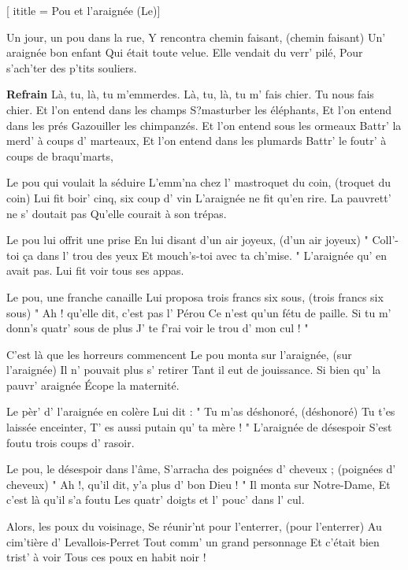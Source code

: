  [
ititle = {Pou et l'araignée (Le)}]



\beginverse
Un jour, un pou dans la rue,
Y rencontra chemin faisant, (chemin faisant)
Un' araignée bon enfant
Qui était toute velue.
Elle vendait du verr' pilé,
Pour s'ach'ter des p'tits souliers.
\endverse

\beginchorus
\textbf {Refrain}
Là, tu, là, tu m'emmerdes.
Là, tu, là, tu m' fais chier.
 {Tu nous fais chier.}
Et l'on entend dans les champs
S?masturber les éléphants,
Et l'on entend dans les prés
Gazouiller les chimpanzés.
Et l'on entend sous les ormeaux
Battr' la merd' à coups d' marteaux,
Et l'on entend dans les plumards
Battr' le foutr' à coups de braqu'marts,
\endchorus

\beginverse
Le pou qui voulait la séduire
L'emm'na chez l' mastroquet du coin, (troquet du coin)
Lui fit boir' cinq, six coup d' vin
L'araignée ne fit qu'en rire.
La pauvrett' ne s' doutait pas
Qu'elle courait à son trépas.
\endverse

\beginverse
Le pou lui offrit une prise
En lui disant d'un air joyeux, (d'un air joyeux)
" Coll'-toi ça dans l' trou des yeux
Et mouch's-toi avec ta ch'mise. "
L'araignée qu' en avait pas.
Lui fit voir tous ses appas.
\endverse

\beginverse

Le pou, une franche canaille
Lui proposa trois francs six sous, (trois francs six sous)
" Ah ! qu'elle dit, c'est pas l' Pérou
Ce n'est qu'un fétu de paille.
Si tu m' donn's quatr' sous de plus
J' te f'rai voir le trou d' mon cul ! "
\endverse

\beginverse
C'est là que les horreurs commencent
Le pou monta sur l'araignée, (sur l'araignée)
Il n' pouvait plus s' retirer
Tant il eut de jouissance.
Si bien qu' la pauvr' araignée
Écope la maternité.
\endverse

\beginverse
Le pèr' d' l'araignée en colère
Lui dit : " Tu m'as déshonoré, (déshonoré)
Tu t'es laissée enceinter,
T' es aussi putain qu' ta mère ! "
L'araignée de désespoir
S'est foutu trois coups d' rasoir.
\endverse

\beginverse
Le pou, le désespoir dans l'âme,
S'arracha des poignées d' cheveux ; (poignées d' cheveux)
" Ah !, qu'il dit, y'a plus d' bon Dieu ! "
Il monta sur Notre-Dame,
Et c'est là qu'il s'a foutu
Les quatr' doigts et l' pouc' dans l' cul.
\endverse

\beginverse
Alors, les poux du voisinage,
Se réunir'nt pour l'enterrer, (pour l'enterrer)
Au cim'tière d' Levallois-Perret
Tout comm' un grand personnage
Et c'était bien trist' à voir
Tous ces poux en habit noir !
\endverse

\endsong